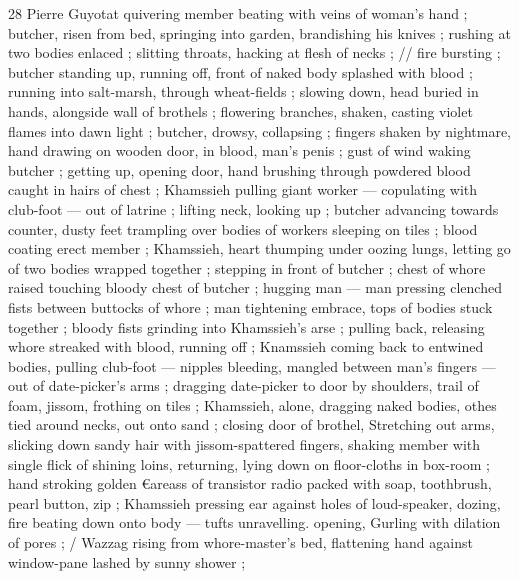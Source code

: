 28 Pierre Guyotat
quivering member beating with veins of woman's hand ; butcher,
risen from bed, springing into garden, brandishing his knives ;
rushing at two bodies enlaced ; slitting throats, hacking at flesh of
necks ; // fire bursting ; butcher standing up, running off, front of
naked body splashed with blood ; running into salt-marsh, through
wheat-fields ; slowing down, head buried in hands, alongside wall of
brothels ; flowering branches, shaken, casting violet flames into
dawn light ; butcher, drowsy, collapsing ; fingers shaken by
nightmare, hand drawing on wooden door, in blood, man's penis ;
gust of wind waking butcher ; getting up, opening door, hand
brushing through powdered blood caught in hairs of chest ;
Khamssieh pulling giant worker — copulating with club-foot — out
of latrine ; lifting neck, looking up ; butcher advancing towards
counter, dusty feet trampling over bodies of workers sleeping on
tiles ; blood coating erect member ; Khamssieh, heart thumping
under oozing lungs, letting go of two bodies wrapped together ;
stepping in front of butcher ; chest of whore raised touching bloody
chest of butcher ; hugging man — man pressing clenched fists
between buttocks of whore ; man tightening embrace, tops of bodies
stuck together ; bloody fists grinding into Khamssieh's arse ; pulling
back, releasing whore streaked with blood, running off ; Knamssieh
coming back to entwined bodies, pulling club-foot — nipples
bleeding, mangled between man's fingers — out of date-picker's
arms ; dragging date-picker to door by shoulders, trail of foam,
jissom, frothing on tiles ; Khamssieh, alone, dragging naked bodies,
othes tied around necks, out onto sand ; closing door of brothel,
Stretching out arms, slicking down sandy hair with jissom-spattered
fingers, shaking member with single flick of shining loins, returning,
lying down on floor-cloths in box-room ; hand stroking golden
€areass of transistor radio packed with soap, toothbrush, pearl
button, zip ; Khamssieh pressing ear against holes of loud-speaker,
dozing, fire beating down onto body — tufts unravelling. opening,
Gurling with dilation of pores ; / Wazzag rising from whore-master's
bed, flattening hand against window-pane lashed by sunny shower ;

